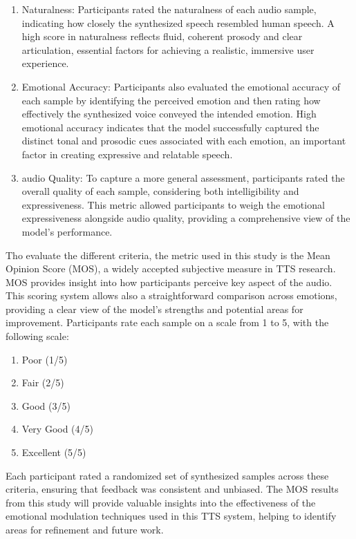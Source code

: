\begin{enumerate}
\item Naturalness: Participants rated the naturalness of each audio sample, indicating how closely the synthesized speech resembled human speech. A high score in naturalness reflects fluid, coherent prosody and clear articulation, essential factors for achieving a realistic, immersive user experience.

\item Emotional Accuracy: Participants also evaluated the emotional accuracy of each sample by identifying the perceived emotion and then rating how effectively the synthesized voice conveyed the intended emotion. High emotional accuracy indicates that the model successfully captured the distinct tonal and prosodic cues associated with each emotion, an important factor in creating expressive and relatable speech.

\item audio Quality: To capture a more general assessment, participants rated the overall quality of each sample, considering both intelligibility and expressiveness. This metric allowed participants to weigh the emotional expressiveness alongside audio quality, providing a comprehensive view of the model’s performance.
\end{enumerate}

Tho evaluate the different criteria, the metric used in this study is the Mean Opinion Score (MOS), a widely accepted subjective measure in TTS research. MOS provides insight into how participants perceive key aspect of the audio. This scoring system allows also a straightforward comparison across emotions, providing a clear view of the model’s strengths and potential areas for improvement. Participants rate each sample on a scale from 1 to 5, with the following scale:

\begin{enumerate}
\item Poor (1/5)
\item Fair (2/5)
\item Good (3/5)
\item Very Good (4/5)
\item Excellent (5/5)
\end{enumerate}

Each participant rated a randomized set of synthesized samples across these criteria, ensuring that feedback was consistent and unbiased. The MOS results from this study will provide valuable insights into the effectiveness of the emotional modulation techniques used in this TTS system, helping to identify areas for refinement and future work.


